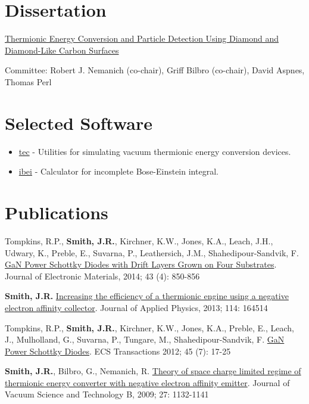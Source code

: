 \section{Dissertation}\label{dissertation}

\href{http://www.lib.ncsu.edu/resolver/1840.16/3107}{Thermionic Energy
Conversion and Particle Detection Using Diamond and Diamond-Like Carbon
Surfaces}

Committee: Robert J. Nemanich (co-chair), Griff Bilbro (co-chair), David
Aspnes, Thomas Perl

\section{Selected Software}\label{selected-software}

\begin{itemize}
\tightlist
\item
  \href{http://jrsmith3.github.io/tec/}{tec} - Utilities for simulating
  vacuum thermionic energy conversion devices.
\item
  \href{http://ibei.readthedocs.org/en/latest/}{ibei} - Calculator for
  incomplete Bose-Einstein integral.
\end{itemize}

\section{Publications}\label{publications}

Tompkins, R.P., \textbf{Smith, J.R.}, Kirchner, K.W., Jones, K.A.,
Leach, J.H., Udwary, K., Preble, E., Suvarna, P., Leathersich, J.M.,
Shahedipour-Sandvik, F.
\href{http://dx.doi.org/10.1007/s11664-014-3021-9}{GaN Power Schottky
Diodes with Drift Layers Grown on Four Substrates}. Journal of
Electronic Materials, 2014; 43 (4): 850-856

\textbf{Smith, J.R.}
\href{http://dx.doi.org/10.1063/1.4826202}{Increasing the efficiency of
a thermionic engine using a negative electron affinity collector}.
Journal of Applied Physics, 2013; 114: 164514

Tompkins, R.P., \textbf{Smith, J.R.}, Kirchner, K.W., Jones, K.A.,
Preble, E., Leach, J., Mulholland, G., Suvarna, P., Tungare, M.,
Shahedipour-Sandvik, F. \href{http://dx.doi.org/10.1149/1.3701521}{GaN
Power Schottky Diodes}. ECS Transactions 2012; 45 (7): 17-25

\textbf{Smith, J.R.}, Bilbro, G., Nemanich, R.
\href{http://dx.doi.org/10.1116/1.3125282}{Theory of space charge
limited regime of thermionic energy converter with negative electron
affinity emitter}. Journal of Vacuum Science and Technology B, 2009; 27:
1132-1141

